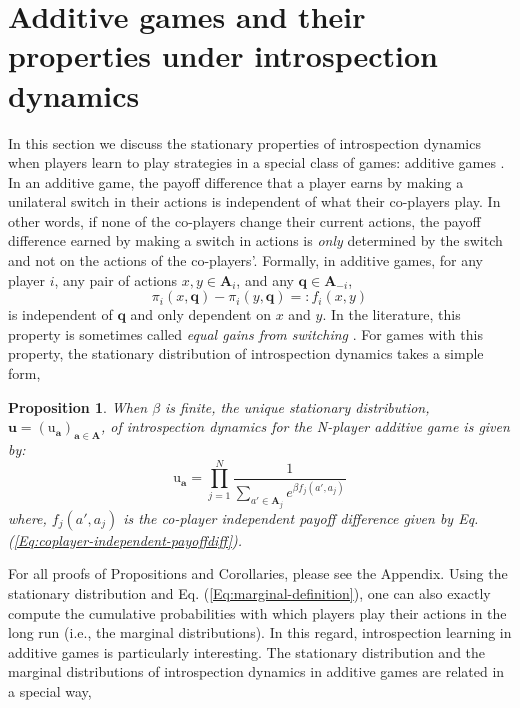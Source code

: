 \documentclass[11pt]{article}
\theoremstyle{plainCl1}
\newtheorem{Prop}{Proposition}
\theoremstyle{plainCl2}
\newcommand{\A}{\mathbf{A}}
\newcommand{\abf}{\mathbf{a}}
\newcommand{\qbf}{\mathbf{q}}
\newcommand{\ubf}{\mathbf{u}}
\begin{document}
\section*{Additive games and their properties under introspection dynamics}
In this section we discuss the stationary properties of introspection dynamics when players learn to play strategies in a special class of games: additive games \cite{McAvoy:PlosCB:2015, Pena:JTB:2014}. In an additive game, the payoff difference that a player earns by making a unilateral switch in their actions is independent of what their co-players play. In other words, if none of the co-players change their current actions, the payoff difference earned by making a switch in actions is \emph{only} determined by the switch and not on the actions of the co-players'. Formally, in additive games, for any player $i$, any pair of actions $x,y \in \A_i$, and any $\qbf \in \A_{-i}$,
\begin{equation}
\pi_i(x, \qbf) - \pi_i(y, \qbf) =: f_i(x,y) 
\label{Eq:coplayer-independent-payoffdiff}
\end{equation}
\noindent is independent of $\qbf$ and only dependent on $x$ and $y$. In the literature, this property is sometimes called \emph{equal gains from switching} \cite{Pena:JTB:2014}. For games with this property, the stationary distribution of introspection dynamics takes a simple form,

 \begin{Prop}
When $\beta$ is finite, the unique stationary distribution, $\ubf = (\mathrm{u}_\abf)_{\abf \in \A}$, of introspection dynamics for the N-player additive game is given by: 
\begin{equation}
\mathrm{u}_\abf = \prod_{j=1}^N \frac{1}{\displaystyle \sum_{a' \in \A_j} e^{\beta f_j(a', a_j)}} 
\label{Eq:additive-game-stationary-distribution}
\end{equation}
where, $f_j(a', a_j)$ is the co-player independent payoff difference given by Eq. (\ref{Eq:coplayer-independent-payoffdiff}).

\label{Th:additive-games-stationary-dist}
\end{Prop}
\noindent For all proofs of Propositions and Corollaries, please see the Appendix. Using the stationary distribution and Eq. (\ref{Eq:marginal-definition}), one can also exactly compute the cumulative probabilities with which players play their actions in the long run (i.e., the marginal distributions). In this regard, introspection learning in additive games is particularly interesting. The stationary distribution and the marginal distributions of introspection dynamics in additive games are related in a special way, 
\end{document}
